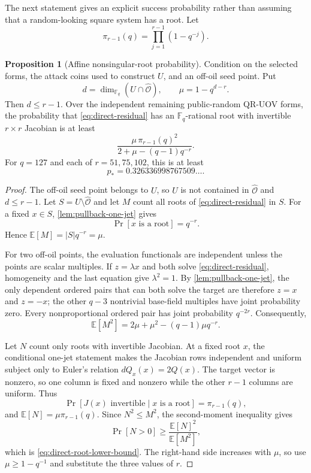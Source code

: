 \documentclass[11pt,a4paper]{article}
\theoremstyle{definition}
\newtheorem{proposition}[theorem]{Proposition}
\theoremstyle{remark}
\newcommand{\F}{\mathbb F}
\newcommand{\cO}{\mathcal O}
\begin{document}
The next statement gives an explicit success probability rather than assuming
that a random-looking square system has a root.  Let
\begin{equation}\label{eq:pi-r-direct}
 \pi_{r-1}(q)=\prod_{j=1}^{r-1}(1-q^{-j}).
\end{equation}

\begin{proposition}[Affine nonsingular-root probability]\label{prop:direct-root-probability}
Condition on the selected forms, the attack coins used to construct $U$, and
an off-oil seed point.  Put
\[
 d=\dim_{\F_q}(U\cap\widehat{\cO}),
 \qquad
 \mu=1-q^{d-r}.
\]
Then $d\le r-1$.  Over the independent remaining public-random QR-UOV forms,
the probability that \eqref{eq:direct-residual} has an $\F_q$-rational root
with invertible $r\times r$ Jacobian is at least
\begin{equation}\label{eq:direct-root-lower-bound}
 \frac{\mu\,\pi_{r-1}(q)^2}
 {2+\mu-(q-1)q^{-r}}.
\end{equation}
For $q=127$ and each of $r=51,75,102$, this is at least
\begin{equation}\label{eq:direct-root-number}
 p_*=0.326336998767509\ldots.
\end{equation}
\end{proposition}

\begin{proof}
The off-oil seed point belongs to $U$, so $U$ is not contained in
$\widehat{\cO}$ and $d\le r-1$.  Let $S=U\setminus\widehat{\cO}$ and let $M$
count all roots of \eqref{eq:direct-residual} in $S$.  For a fixed $x\in S$,
\cref{lem:pullback-one-jet} gives
\[
 \Pr[x\text{ is a root}]=q^{-r}.
\]
Hence $\mathbb E[M]=|S|q^{-r}=\mu$.

For two off-oil points, the evaluation functionals are independent unless the
points are scalar multiples.  If $z=\lambda x$ and both solve
\eqref{eq:direct-residual}, homogeneity and the last equation give
$\lambda^2=1$.  By \cref{lem:pullback-one-jet}, the only dependent ordered
pairs that can both solve the target are therefore $z=x$ and $z=-x$; the
other $q-3$ nontrivial base-field multiples have joint probability zero.  Every
nonproportional ordered pair has joint probability $q^{-2r}$.  Consequently,
\begin{equation}\label{eq:root-second-moment}
 \mathbb E[M^2]
 =2\mu+\mu^2-(q-1)\mu q^{-r}.
\end{equation}

Let $N$ count only roots with invertible Jacobian.  At a fixed root $x$, the
conditional one-jet statement makes the Jacobian rows independent and uniform
subject only to Euler's relation $dQ_x(x)=2Q(x)$.  The target vector is
nonzero, so one column is fixed and nonzero while the other $r-1$ columns are
uniform.  Thus
\[
 \Pr[J(x)\text{ invertible}\mid x\text{ is a root}]
 =\pi_{r-1}(q),
\]
and $\mathbb E[N]=\mu\pi_{r-1}(q)$.  Since $N^2\le M^2$, the second-moment
inequality gives
\[
 \Pr[N>0]
 \ge\frac{\mathbb E[N]^2}{\mathbb E[M^2]},
\]
which is \eqref{eq:direct-root-lower-bound}.  The right-hand side increases
with $\mu$, so use $\mu\ge1-q^{-1}$ and substitute the three values of $r$.
\end{proof}
\end{document}
